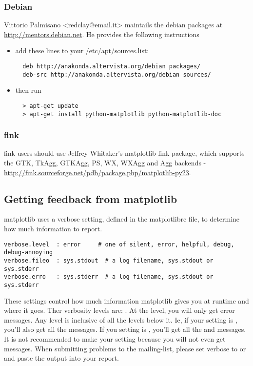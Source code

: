 \documentclass[twoside]{book}
\begin{document}
\subsubsection{Debian}
\label{sec:debian}

Vittorio Palmisano <redclay@email.it> maintails the debian
packages at \url{http://mentors.debian.net}.  He provides the
following instructions

\begin{itemize}
\item       add these lines to your /etc/apt/sources.list:
\begin{verbatim}
  deb http://anakonda.altervista.org/debian packages/
  deb-src http://anakonda.altervista.org/debian sources/
\end{verbatim}

\item then run

\begin{verbatim}
  > apt-get update
  > apt-get install python-matplotlib python-matplotlib-doc
\end{verbatim}
\end{itemize}

\subsubsection{fink}
\label{sec:fink}

fink users should use Jeffrey Whitaker's matplotlib fink package,
which supports the GTK, TkAgg, GTKAgg, PS, WX, WXAgg and Agg backends
- \url{http://fink.sourceforge.net/pdb/package.php/matplotlib-py23}.

\subsection{Getting feedback from matplotlib}

matplotlib uses a verbose setting, defined in the matplotlibrc file,
to determine how much information to report. 

\begin{verbatim}
verbose.level  : error     # one of silent, error, helpful, debug, debug-annoying
verbose.fileo  : sys.stdout  # a log filename, sys.stdout or sys.stderr
verbose.erro   : sys.stderr  # a log filename, sys.stdout or sys.stderr

\end{verbatim}


\noindent These settings control how much information matplotlib gives you at
runtime and where it goes.  Ther verbosity levels are: .  At the  level,
you will only get error messages.  Any level is inclusive of all the
levels below it.  Ie, if your setting is , you'll also get
all the  messages.  If you setting is , you'll get
all the  and  messages.  It is not recommended
to make your setting  because you will not even get
 messages.  When submitting problems to the mailing-list,
please set verbose to  or  and paste the output
into your report.
\end{document}
